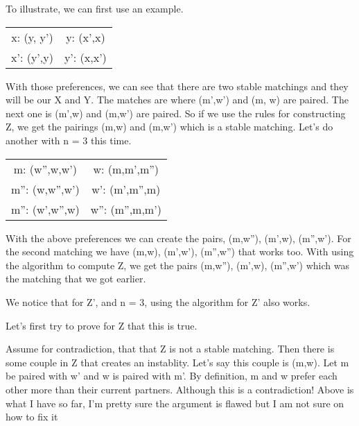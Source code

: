 \documentclass{article}
\begin{document}
To illustrate, we can first use an example. 

\begin{center}
    \begin{tabular}{ c c  }
        x: (y, y') & y: (x',x) \\ 
        x': (y',y) & y': (x,x')  \\     
    \end{tabular}
    \end{center}


With those preferences, we can see that there are two stable matchings and they will be our X and Y. The matches are where (m',w') and (m, w) are paired. The next one is 
(m',w) and (m,w') are paired. So if we use the rules for constructing Z, we get the pairings (m,w) and (m,w') which is a stable matching.
Let's do another with n = 3 this time. 

\begin{center}
    \begin{tabular}{ c c  }
        m: (w'',w,w') & w: (m,m',m'') \\ 
        m'': (w,w'',w') & w': (m',m'',m) \\
        m'': (w',w'',w) & w'': (m'',m,m')  \\     
    \end{tabular}
    \end{center}

With the above preferences we can create the pairs, (m,w''), (m',w), (m'',w'). For the second matching we have (m,w), (m',w'), (m'',w'') that works too. 
With using the algorithm to compute Z, we get the pairs (m,w''), (m',w), (m'',w') which was the matching that we got earlier.

We notice that for Z', and n = 3, using the algorithm for Z' also works. 
\vspace{3mm}

Let's first try to prove for Z that this is true. 
\vspace{3mm}

Assume for contradiction, that that Z is not a stable matching. Then there is some couple in Z that creates an instablity. Let's say this couple is (m,w). Let m be paired with w' and w is paired with m'. 
By definition, m and w prefer each other more than their current partners. Although this is a contradiction! 
Above is what I have so far, I'm pretty sure the argument is flawed but I am not sure on how to fix it
\end{document}
